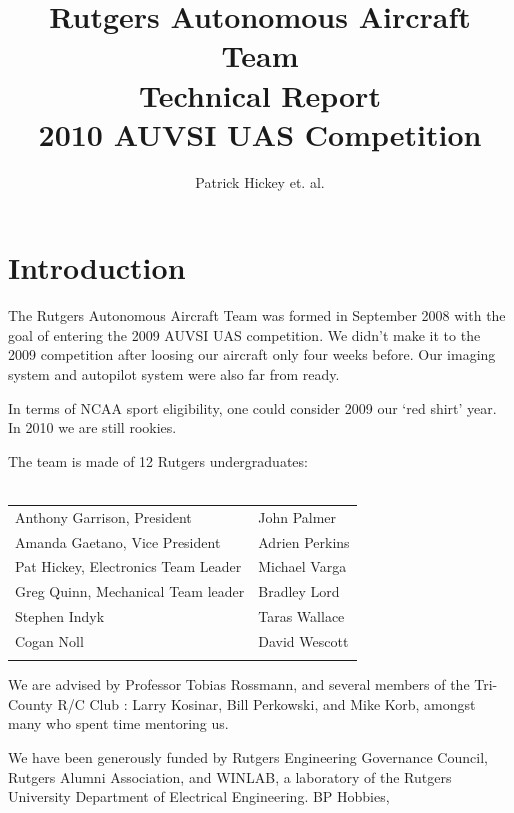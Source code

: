 \documentclass[10pt,twocolumns]{report}
\begin{document}
\title{Rutgers Autonomous Aircraft Team\\Technical Report\\2010 AUVSI UAS Competition}
\author{Patrick Hickey et. al.}



\section{Introduction}

The Rutgers Autonomous Aircraft Team was formed in September 2008 with the goal of entering the 2009 AUVSI UAS competition. We didn't make it to the 2009 competition after loosing our aircraft only four weeks before. Our imaging system and autopilot system were also far from ready. 

In terms of NCAA sport eligibility, one could consider 2009 our `red shirt' year. In 2010 we are still rookies.

The team is made of 12 Rutgers undergraduates:\\
\\ \begin{tabular}{l l}
Anthony Garrison, President & John Palmer \\
Amanda Gaetano, Vice President & Adrien Perkins\\
Pat Hickey, Electronics Team Leader & Michael Varga\\
Greg Quinn, Mechanical Team leader & Bradley Lord\\
Stephen Indyk & Taras Wallace\\ 
Cogan Noll & David Wescott\\ \\
\end{tabular}

We are advised by
 Professor Tobias Rossmann,
 and several members of the Tri-County R/C Club \cite{tricountyRC}:
 Larry Kosinar,
 Bill Perkowski,
and  Mike Korb, 
amongst many who spent time mentoring us.

We have been generously funded by 
Rutgers Engineering Governance Council,
Rutgers Alumni Association, and
WINLAB, a laboratory of the Rutgers University Department of Electrical Engineering.
BP Hobbies, 
\end{document}
